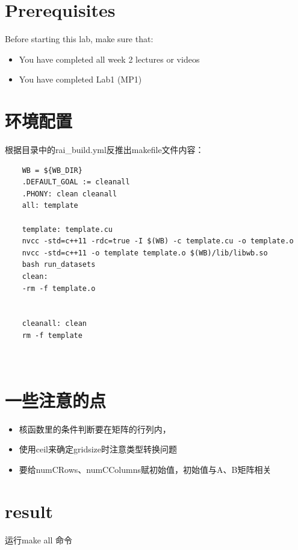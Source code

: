\documentclass[11pt]{ctexart}
\begin{document}
\section{Prerequisites}

Before starting this lab, make sure that:
\begin{itemize}
	

	\item You have completed all week 2 lectures or videos
	\item You have completed Lab1 (MP1)

\end{itemize}

\section{环境配置}
根据目录中的rai\_build.yml反推出makefile文件内容：

\begin{lstlisting}
	WB = ${WB_DIR}
	.DEFAULT_GOAL := cleanall
	.PHONY: clean cleanall
	all: template
	
	template: template.cu
	nvcc -std=c++11 -rdc=true -I $(WB) -c template.cu -o template.o
	nvcc -std=c++11 -o template template.o $(WB)/lib/libwb.so
	bash run_datasets
	clean:
	-rm -f template.o
	
	
	cleanall: clean
	rm -f template
	
	
\end{lstlisting}


\section{一些注意的点}

\begin{itemize}
	\item 核函数里的条件判断要在矩阵的行列内，
	\item 使用ceil来确定gridsize时注意类型转换问题
	\item 要给numCRows、numCColumns赋初始值，初始值与A、B矩阵相关
\end{itemize}

\section{result}

运行make all 命令
\end{document}
